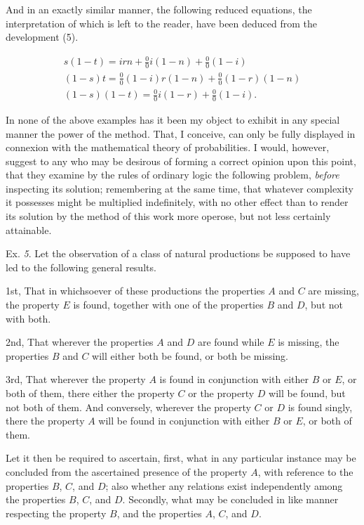 \documentclass[oneside]{book}
\begin{document}
And in an exactly similar manner, the following reduced
equations, the interpretation of which is left to the reader, have been
deduced from the development (5).

\begin{eqnarray*}
s(1-t) = irn + \frac{0}{0}i(1-n) + \frac{0}{0}(1-i) \\
(1-s) t = \frac{0}{0}(1-i)r(1-n) + \frac{0}{0}(1-r)(1-n) \\
(1-s)(1-t) = \frac{0}{0}i(1-r) + \frac{0}{0}(1-i).
\end{eqnarray*}

In none of the above examples has it been my object to exhibit
in any special manner the power of the method. That,
I conceive, can only be fully displayed in connexion with the
mathematical theory of probabilities. I would, however, suggest
to any who may be desirous of forming a correct opinion upon
this point, that they examine by the rules of ordinary logic the
following problem, \textit{before} inspecting its solution; remembering
at the same time, that whatever complexity it possesses might
be multiplied indefinitely, with no other effect than to render its
solution by the method of this work more operose, but not less
certainly attainable.

Ex. \textit{5}. Let the observation of a class of natural productions
be supposed to have led to the following general results.

1st, That in whichsoever of these productions the properties
$A$ and $C$ are missing, the property $E$ is found, together with one
of the properties $B$ and $D$, but not with both.

2nd, That wherever the properties $A$ and $D$ are found while
$E$ is missing, the properties $B$ and $C$ will either both be found,
or both be missing.

3rd, That wherever the property $A$ is found in conjunction
with either $B$ or $E$, or both of them, there either the property
$C$ or the property $D$ will be found, but not both of them. And
conversely, wherever the property $C$ or $D$ is found singly, there
the property $A$ will be found in conjunction with either $B$ or $E$,
or both of them.

Let it then be required to ascertain, first, what in any particular
instance may be concluded from the ascertained presence of
the property $A$, with reference to the properties $B$, $C$, and $D$;
also whether any relations exist independently among the properties
$B$, $C$, and $D$. Secondly, what may be concluded in like
manner respecting the property $B$, and the properties $A$, $C$,
and $D$.
\end{document}

